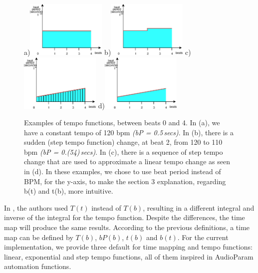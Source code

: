 \documentclass{sig-alternate}
\begin{document}
\begin{figure}
	a)\includegraphics[width=1.5in]{eps/constant-bpm}
	b)\includegraphics[width=1.5in]{eps/step-bpm}
	c)\includegraphics[width=1.5in]{eps/aprox-bpm}
	d)\includegraphics[width=1.5in]{eps/linear-bpm}
	\caption{Examples of tempo functions, between beats 0 and 4. In (a), we have a constant tempo of 120 bpm \textit{(bP = 0.5\,secs)}. In (b), there is a sudden (step tempo function) change, at beat 2, from 120 to 110 bpm \textit{(bP = 0.(54)\,secs)}. In (c), there is a sequence of step tempo change that are used to approximate a linear tempo change as seen in (d). In these examples, we chose to use beat period instead of BPM, for the y-axis, to make the section 3 explanation, regarding b(t) and t(b), more intuitive. } 
	\label{fig:tempochanges} 
\end{figure} 
In \cite{wheresthebeat}, the authors used $T(t)$ instead of $T(b)$, resulting in a different integral and inverse of the integral for the tempo function. Despite the differences, the time map will produce the same results. According to the previous definitions, a time map can be defined by $T(b)$, $bP(b)$, $t(b)$ and $b(t)$. For the current implementation, we provide three default for time mapping and tempo functions: linear, exponential and step tempo functions, all of them inspired in AudioParam automation functions.
\end{document}
